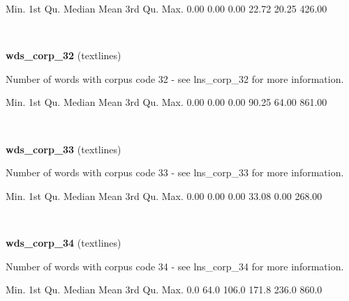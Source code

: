 \documentclass[]{article}
\newenvironment{Shaded}{\begin{snugshade}}{\end{snugshade}}
\newcommand{\FloatTok}[1]{\textcolor[rgb]{0.00,0.00,0.81}{{#1}}}
\newcommand{\NormalTok}[1]{{#1}}
\begin{document}
\begin{Shaded}
\begin{Highlighting}[]
   \NormalTok{Min. 1st Qu.  Median    Mean 3rd Qu.    Max. }
   \FloatTok{0.00}    \FloatTok{0.00}    \FloatTok{0.00}   \FloatTok{22.72}   \FloatTok{20.25}  \FloatTok{426.00} 
\end{Highlighting}
\end{Shaded}

~

\vspace{1em}

\textbf{wds\_corp\_32} (textlines)

Number of words with corpus code 32 - see lns\_corp\_32 for more
information.

\begin{Shaded}
\begin{Highlighting}[]
   \NormalTok{Min. 1st Qu.  Median    Mean 3rd Qu.    Max. }
   \FloatTok{0.00}    \FloatTok{0.00}    \FloatTok{0.00}   \FloatTok{90.25}   \FloatTok{64.00}  \FloatTok{861.00} 
\end{Highlighting}
\end{Shaded}

~

\vspace{1em}

\textbf{wds\_corp\_33} (textlines)

Number of words with corpus code 33 - see lns\_corp\_33 for more
information.

\begin{Shaded}
\begin{Highlighting}[]
   \NormalTok{Min. 1st Qu.  Median    Mean 3rd Qu.    Max. }
   \FloatTok{0.00}    \FloatTok{0.00}    \FloatTok{0.00}   \FloatTok{33.08}    \FloatTok{0.00}  \FloatTok{268.00} 
\end{Highlighting}
\end{Shaded}

~

\vspace{1em}

\textbf{wds\_corp\_34} (textlines)

Number of words with corpus code 34 - see lns\_corp\_34 for more
information.

\begin{Shaded}
\begin{Highlighting}[]
   \NormalTok{Min. 1st Qu.  Median    Mean 3rd Qu.    Max. }
    \FloatTok{0.0}    \FloatTok{64.0}   \FloatTok{106.0}   \FloatTok{171.8}   \FloatTok{236.0}   \FloatTok{860.0} 
\end{Highlighting}
\end{Shaded}
\end{document}

